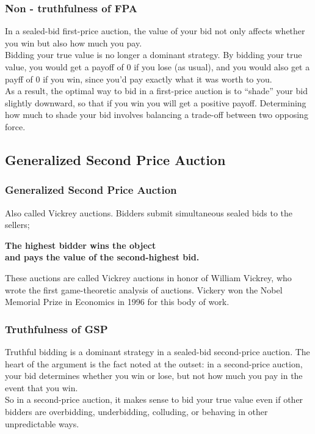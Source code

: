 \documentclass{beamer}
\begin{document}
\begin{frame}
\frametitle{Non - truthfulness of FPA}
In a sealed-bid first-price auction, the value of your bid not only affects whether you win but also how much you pay.\\
\medskip
Bidding your true value is no longer a dominant strategy. By bidding your true value, you would get a payoff of 0 if you lose (as usual), and you would also get a payff of 0 if you win, since you’d pay exactly what it was worth to you.\\
\medskip
As a result, the optimal way to bid in a first-price auction is to “shade” your bid slightly downward, so that if you win you will get a positive payoff. Determining how much to shade your bid involves balancing a trade-off between two opposing force.
\end{frame}

\subsection{Generalized Second Price Auction}
\begin{frame}
\frametitle{Generalized Second Price Auction}
Also called Vickrey auctions. Bidders submit simultaneous sealed bids to the sellers;
\begin{center} 
\textbf{The highest bidder wins the object \\
and pays the value of the second-highest bid.} 
\end{center}
These auctions are called Vickrey auctions in honor of William Vickrey, who wrote the first game-theoretic analysis of auctions. Vickery won the Nobel Memorial Prize in Economics in 1996 for this body of work.
\end{frame}

\begin{frame}
\frametitle{Truthfulness of GSP}
Truthful bidding is a dominant strategy in a sealed-bid second-price auction. The heart of the argument is the fact noted at the outset: in a second-price auction, your bid determines whether you win or lose, but not how much you pay in the event that you win. \\
\medskip
So in a second-price auction, it makes sense to bid your true value even if other bidders are overbidding, underbidding, colluding, or behaving in other unpredictable ways.
\end{frame}
\end{document}
